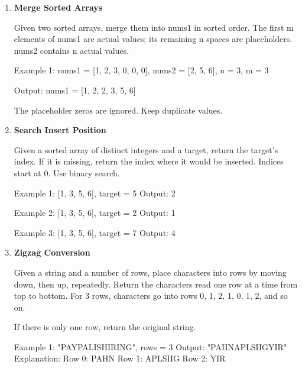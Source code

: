 \begin{enumerate}
\begin{console}
Example 2: [9, 9]
Output:    [1, 0, 0]
\end{console}\newpage


\item \textbf{Merge Sorted Arrays}

Given two sorted arrays, merge them into nums1 in sorted order. The first m elements of nums1 are actual values; its remaining n spaces are placeholders. nums2 contains n actual values.

\begin{console}
Example 1: nums1 = [1, 2, 3, 0, 0, 0],
		   nums2 = [2, 5, 6],
		   n = 3,
		   m = 3
		   
Output:    nums1 = [1, 2, 2, 3, 5, 6]

The placeholder zeros are ignored. Keep duplicate values.
\end{console}\newpage


\item \textbf{Search Insert Position}

Given a sorted array of distinct integers and a target, return the target's index. If it is missing, return the index where it would be inserted. Indices start at 0. Use binary search.

\begin{console}
Example 1: [1, 3, 5, 6], target = 5
Output:    2

Example 2: [1, 3, 5, 6], target = 2
Output:    1

Example 3: [1, 3, 5, 6], target = 7
Output:    4
\end{console}\newpage


\item \textbf{Zigzag Conversion}

Given a string and a number of rows, place characters into rows by moving down, then up, repeatedly. Return the characters read one row at a time from top to bottom.
For 3 rows, characters go into rows 0, 1, 2, 1, 0, 1, 2, and so on.

If there is only one row, return the original string.
\begin{console}
Example 1: "PAYPALISHIRING", rows = 3
Output:    "PAHNAPLSIIGYIR"
Explanation:
Row 0: PAHN
Row 1: APLSIIG
Row 2: YIR
\end{console}\newpage



\end{enumerate}
